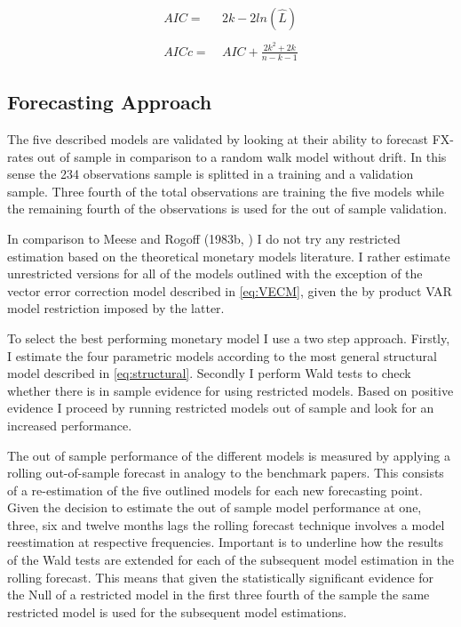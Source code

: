 \begin{align}
  AIC =& \ 2k - 2ln(\hat{L}) \nonumber \\
  \label{eq:AICc} \\
  AICc =& \ AIC + \frac{2k^2 + 2k}{n - k - 1} \nonumber
\end{align}


\subsection{Forecasting Approach}
\label{sub:forecast}
The five described models are validated by looking at their ability to
forecast FX-rates out of sample in comparison to a random walk model
without drift. In this sense the 234 observations sample is splitted in a
training and a validation sample. Three fourth of the total
observations are training the five models while the remaining fourth
of the observations is used for the out of sample validation.

In comparison to Meese and Rogoff (1983b, \cite{MeeseRogoffb}) I do
not try any restricted estimation based on the theoretical monetary
models literature. I rather estimate unrestricted versions for all of
the models outlined with the exception of the vector error correction
model described in \ref{eq:VECM}, given the by product VAR model
restriction imposed by the latter.

To select the best performing monetary model I use a two step
approach. Firstly, I estimate the four parametric models according to
the most general structural model described in
\ref{eq:structural}. Secondly I perform Wald tests to check whether
there is in sample evidence for using restricted models. Based on
positive evidence I proceed by running restricted models out of
sample and look for an increased performance.

The out of sample performance of the different models is measured by
applying a rolling out-of-sample forecast in analogy to the benchmark
papers. This consists of a re-estimation of the five outlined models
for each new forecasting point. Given the decision to estimate the out
of sample model performance at one, three, six and twelve months lags
the rolling forecast technique involves a model reestimation at
respective frequencies. Important is to underline how the results of
the Wald tests are extended for each of the subsequent model
estimation in the rolling forecast. This means that given the
statistically significant evidence for the Null of a restricted model
in the first three fourth of the sample the same restricted model is
used for the subsequent model estimations.

